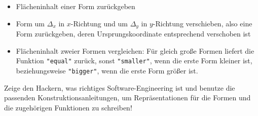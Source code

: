 \begin{aufgabe}
\begin{itemize}
\begin{itemize}
    \item Flächeninhalt einer Form zurückgeben

    \item Form um $\Delta_x$ in $x$-Richtung und um $\Delta_y$ in
      $y$-Richtung verschieben, also eine Form zurückgeben, deren
      Ursprungskoordinate entsprechend verschoben ist

  \item  Flächeninhalt zweier
    Formen vergleichen: Für gleich große Formen liefert die Funktion
    \verb|"equal"| zurück, sonst \verb|"smaller"|, wenn die erste
    Form kleiner ist, beziehungsweise \verb|"bigger"|, wenn die erste
    Form größer ist.
    \end{itemize}

  \end{itemize}
  Zeige den Hackern, was richtiges Software-Engineering ist und
  benutze die passenden Konstruktionsanleitungen, um Repräsentationen für die Formen und die zugehörigen
  Funktionen zu schreiben!
\end{aufgabe}


